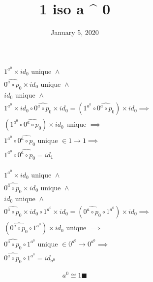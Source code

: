 \documentclass[fleqn, 11pt]{article}
\date{January 5, 2020}
\title{1 iso a ^ 0}
\begin{document}

\begin{equation}
\tag{from}
\begin{aligned}
& 1^{a^0} \times id_0 \text{ unique } \land \\
& \widehat{0^a \circ p_0} \times id_0 \text{ unique } \land \\
& id_0 \text{ unique } \land \\
& 1^{a^0} \times id_0 \circ \widehat{0^a \circ p_0} \times id_0 =
  (1^{a^0} \circ \widehat{0^a \circ p_0}) \times id_0 \implies \\
& (1^{a^0} \circ \widehat{0^a \circ p_0}) \times id_0 \text{ unique }
  \implies \\
& 1^{a^0} \circ \widehat{0^a \circ p_0} \text{ unique } \in 1 \rightarrow 1
  \implies \\
& 1^{a^0} \circ \widehat{0^a \circ p_0} = id_1
\end{aligned}
\end{equation}

\begin{equation}
\tag{to}
\begin{aligned}
& 1^{a^0} \times id_0 \text{ unique } \land \\
& \widehat{0^a \circ p_0} \times id_0 \text{ unique } \land \\
& id_0 \text{ unique } \land \\
& \widehat{0^a \circ p_0} \times id_0 \circ 1^{a^0} \times id_0 =
  (\widehat{0^a \circ p_0} \circ 1^{a^0}) \times id_0 \implies \\
& (\widehat{0^a \circ p_0} \circ 1^{a^0}) \times id_0 \text{ unique } \implies \\
& \widehat{0^a \circ p_0} \circ 1^{a^0} \text{ unique } \in 
  0^{a^0} \rightarrow 0^{a^0} \implies \\
& \widehat{0^a \circ p_0} \circ 1^{a^0} = id_{a^0}
\end{aligned}
\end{equation}

\hrulefill

$$ a^0 \cong 1 \blacksquare $$
\end{document}
